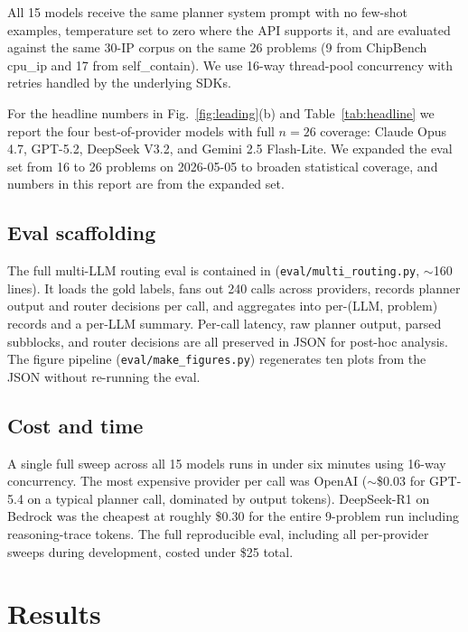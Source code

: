 \documentclass[conference]{IEEEtran}
\begin{document}
All 15 models receive the same planner system prompt with no few-shot examples, temperature set to zero where the API supports it, and are evaluated against the same 30-IP corpus on the same 26 problems (9 from ChipBench cpu\_ip and 17 from self\_contain). We use 16-way thread-pool concurrency with retries handled by the underlying SDKs.

For the headline numbers in Fig.~\ref{fig:leading}(b) and Table~\ref{tab:headline} we report the four best-of-provider models with full $n=26$ coverage: Claude Opus 4.7, GPT-5.2, DeepSeek V3.2, and Gemini 2.5 Flash-Lite. We expanded the eval set from 16 to 26 problems on 2026-05-05 to broaden statistical coverage, and numbers in this report are from the expanded set.

\subsection{Eval scaffolding}

The full multi-LLM routing eval is contained in (\texttt{eval/multi\_routing.py}, $\sim$160 lines). It loads the gold labels, fans out 240 calls across providers, records planner output and router decisions per call, and aggregates into per-(LLM, problem) records and a per-LLM summary. Per-call latency, raw planner output, parsed subblocks, and router decisions are all preserved in JSON for post-hoc analysis. The figure pipeline (\texttt{eval/make\_figures.py}) regenerates ten plots from the JSON without re-running the eval.

\subsection{Cost and time}

A single full sweep across all 15 models runs in under six minutes using 16-way concurrency. The most expensive provider per call was OpenAI ($\sim$\$0.03 for GPT-5.4 on a typical planner call, dominated by output tokens). DeepSeek-R1 on Bedrock was the cheapest at roughly \$0.30 for the entire 9-problem run including reasoning-trace tokens. The full reproducible eval, including all per-provider sweeps during development, costed under \$25 total.

\section{Results}
\end{document}
